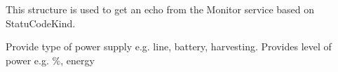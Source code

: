 \documentclass[a4paper]{arrowhead}
\newcommand{\pref}[1]{{\textcolor{ArrowheadGrey}{\hyperref[sec:model:primitives:#1]{#1}}}}
\begin{document}

This structure is used to get an echo from the Monitor service
based on StatuCodeKind.
 



Provide type of power supply e.g. line, battery, harvesting.
Provides level of power e.g. \%, energy


\end{document}
